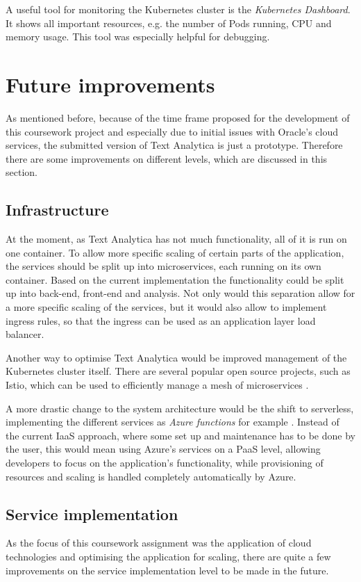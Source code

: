 \documentclass[conference]{IEEEtran}
\begin{document}
A useful tool for monitoring the Kubernetes cluster is the \textit{Kubernetes Dashboard}. It shows all important resources, e.g. the number of Pods running, CPU and memory usage. This tool was especially helpful for debugging.

\section{Future improvements}
\label{sec:future-improvements}
As mentioned before, because of the time frame proposed for the development of this coursework project and especially due to initial issues with Oracle's cloud services, the submitted version of Text Analytica is just a prototype. Therefore there are some improvements on different levels, which are discussed in this section.

\subsection{Infrastructure}
At the moment, as Text Analytica has not much functionality, all of it is run on one container. To allow more specific scaling of certain parts of the application, the services should be split up into microservices, each running on its own container. Based on the current implementation the functionality could be split up into back-end, front-end and analysis. Not only would this separation allow for a more specific scaling of the services, but it would also allow to implement ingress rules, so that the ingress can be used as an application layer load balancer.

Another way to optimise Text Analytica would be improved management of the Kubernetes cluster itself. There are several popular open source projects, such as Istio, which can be used to efficiently manage a mesh of microservices \cite{Istio}.

A more drastic change to the system architecture would be the shift to serverless, implementing the different services as \textit{Azure functions} for example \cite{AzureFunctions}. Instead of the current IaaS approach, where some set up and maintenance has to be done by the user, this would mean using Azure's services on a PaaS level, allowing developers to focus on the application's functionality, while provisioning of resources and scaling is handled completely automatically by Azure.

\subsection{Service implementation}
As the focus of this coursework assignment was the application of cloud technologies and optimising the application for scaling, there are quite a few improvements on the service implementation level to be made in the future.
\end{document}
